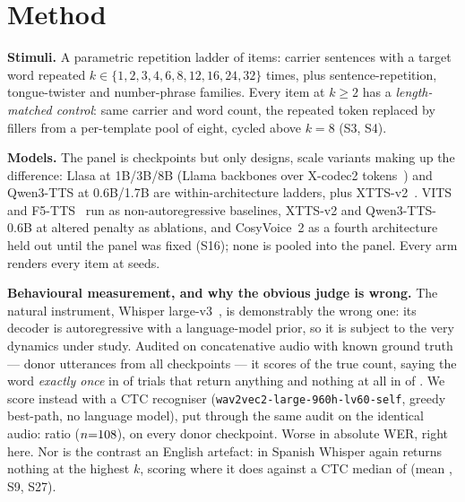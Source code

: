\documentclass{article}
\begin{document}
\section{Method}
\label{sec:method}

\noindent\textbf{Stimuli.}
A parametric repetition ladder of \NStimuli{} items: carrier sentences with a
target word repeated $k \in \{1,2,3,4,6,8,12,16,24,32\}$ times, plus
sentence-repetition, tongue-twister and number-phrase families. Every item at
$k\ge2$ has a
\emph{length-matched control}: same carrier and word count, the repeated token
replaced by fillers from a per-template pool of eight, cycled above $k\!=\!8$ (S3, S4).

\noindent\textbf{Models.}
The panel is \NModels{} checkpoints but only \NFamilies{} designs, scale
variants making up the difference: Llasa at 1B/3B/8B (Llama backbones over X-codec2
tokens~\cite{ye2025llasa}) and Qwen3-TTS at 0.6B/1.7B are within-architecture
ladders, plus XTTS-v2~\cite{casanova2024xtts}. VITS~\cite{kim2021vits} and
F5-TTS~\cite{chen2024f5tts} run as non-autoregressive baselines, XTTS-v2 and
Qwen3-TTS-0.6B at altered penalty as ablations, and CosyVoice~2 as a fourth
architecture held out until the panel was fixed (S16); none is pooled into the
panel. Every arm renders every item at \NSeeds{} seeds.

\noindent\textbf{Behavioural measurement, and why the obvious judge is wrong.}
The natural instrument, Whisper large-v3~\cite{radford2023whisper}, is
demonstrably the wrong one: its decoder is autoregressive with a language-model
prior, so it is subject to the very dynamics under study. Audited on concatenative audio with known ground truth --- \JudgeScaleAtoms{}
donor utterances from all \JudgeScaleDonors{} checkpoints --- it scores
\JudgeScaleWhisperMed{} of the true count, saying the word \emph{exactly once} in
\JudgeScaleWhisperOne{} of \JudgeScaleNWhisper{} trials that return anything and
nothing at all in \JudgeScaleNWhisperErr{} of \JudgeScaleNWhisperAll{}. We score instead with a CTC recogniser
(\texttt{wav2vec2-large-960h-lv60-self}, greedy best-path, no language model),
put through the same audit on the identical audio: ratio \JudgeScaleCtcMed{}
($n{=}108{}$), on every donor checkpoint. Worse in absolute WER, right here. Nor is the contrast
an English artefact: in Spanish Whisper again returns nothing at the
\EsWhisperNoReturn{} highest $k$, scoring \EsWhisperPer{} where it does against
a CTC median of \EsCtcPer{} (mean \EsCtcMean{}, S9, S27).
\end{document}
